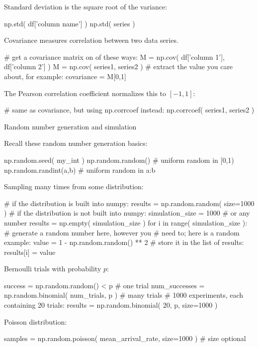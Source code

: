 \documentclass[a4paper,landscape,columns=3]{cheatsheet}
\def\sect#1{\begin{tcolorbox}[colback=blue!5!white,colframe=blue!75!black,size=title,leftrule=2mm]
    \large #1
\end{tcolorbox}}
\begin{document}
Standard deviation is the square root of the variance:
\begin{python}
np.std( df['column name'] )
np.std( series )
\end{python}

Covariance measures correlation between two data series.
\begin{python}
# get a covariance matrix on of these ways:
M = np.cov( df['column 1'], df['column 2'] )
M = np.cov( series1, series2 )
# extract the value you care about, for example:
covariance = M[0,1]
\end{python}

The Pearson correlation coefficient normalizes this to $[-1,1]$:
\begin{python}
# same as covariance, but using np.corrcoef instead:
np.corrcoef( series1, series2 )
\end{python}

\sect{Random number generation and simulation}

Recall these random number generation basics:
\begin{python}
np.random.seed( my_int )
np.random.random()        # uniform random in [0,1)
np.random.randint(a,b)    # uniform random in a:b
\end{python}

Sampling many times from some distribution:
\begin{python}
# if the distribution is built into numpy:
results = np.random.random( size=1000 )
# if the distribution is not built into numpy:
simulation_size = 1000    # or any number
results = np.empty( simulation_size )
for i in range( simulation_size ):
    # generate a random number here, however you
    # need to; here is a random example:
    value = 1 - np.random.random() ** 2
    # store it in the list of results:
    results[i] = value
\end{python}

Bernoulli trials with probability $p$:
\begin{python}
success = np.random.random() < p    # one trial
num_successes = np.random.binomial(
    num_trials, p )                 # many trials
# 1000 experiments, each containing 20 trials:
results = np.random.binomial( 20, p, size=1000 )
\end{python}

Poisson distribution:
\begin{python}
samples = np.random.poisson(
    mean_arrival_rate, size=1000 )  # size optional
\end{python}
\end{document}
